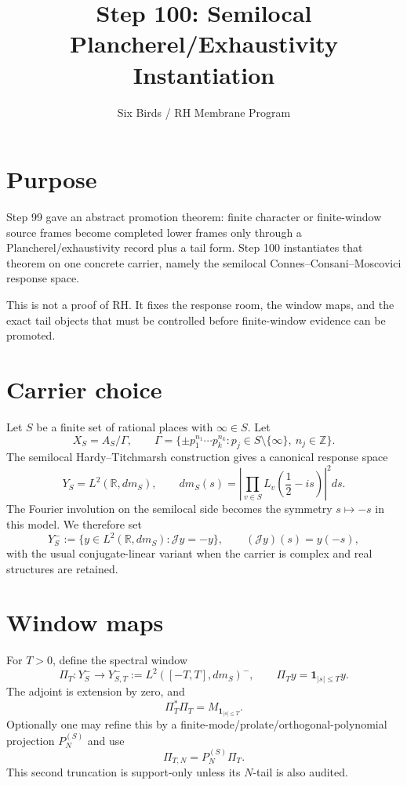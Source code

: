 \documentclass[11pt]{article}
\title{Step 100: Semilocal Plancherel/Exhaustivity Instantiation}
\author{Six Birds / RH Membrane Program}
\date{}
\newcommand{\R}{\mathbb R}
\newcommand{\one}{\mathbf 1}
\begin{document}
\maketitle

\section{Purpose}
Step 99 gave an abstract promotion theorem: finite character or finite-window source frames become completed lower frames only through a Plancherel/exhaustivity record plus a tail form.  Step 100 instantiates that theorem on one concrete carrier, namely the semilocal Connes--Consani--Moscovici response space.

This is not a proof of RH.  It fixes the response room, the window maps, and the exact tail objects that must be controlled before finite-window evidence can be promoted.

\section{Carrier choice}
Let $S$ be a finite set of rational places with $\infty\in S$.  Let
\[
  X_S=A_S/\Gamma,
  \qquad
  \Gamma=\{\pm p_1^{n_1}\cdots p_k^{n_k}:p_j\in S\setminus\{\infty\},\ n_j\in\mathbb Z\}.
\]
The semilocal Hardy--Titchmarsh construction gives a canonical response space
\[
  Y_S=L^2(\R,dm_S),
  \qquad
  dm_S(s)=\left|\prod_{v\in S}L_v\!\left(\frac12-is\right)\right|^2ds.
\]
The Fourier involution on the semilocal side becomes the symmetry $s\mapsto -s$ in this model.  We therefore set
\[
  Y_S^-:=\{y\in L^2(\R,dm_S):\mathcal J y=-y\},
  \qquad (\mathcal J y)(s)=y(-s),
\]
with the usual conjugate-linear variant when the carrier is complex and real structures are retained.

\section{Window maps}
For $T>0$, define the spectral window
\[
  \Pi_T:Y_S^-\to Y_{S,T}^-:=L^2([-T,T],dm_S)^-,
  \qquad
  \Pi_Ty=\one_{|s|\le T}y.
\]
The adjoint is extension by zero, and
\[
  \Pi_T^*\Pi_T=M_{\one_{|s|\le T}}.
\]
Optionally one may refine this by a finite-mode/prolate/orthogonal-polynomial projection $P_N^{(S)}$ and use
\[
  \Pi_{T,N}=P_N^{(S)}\Pi_T.
\]
This second truncation is support-only unless its $N$-tail is also audited.
\end{document}
